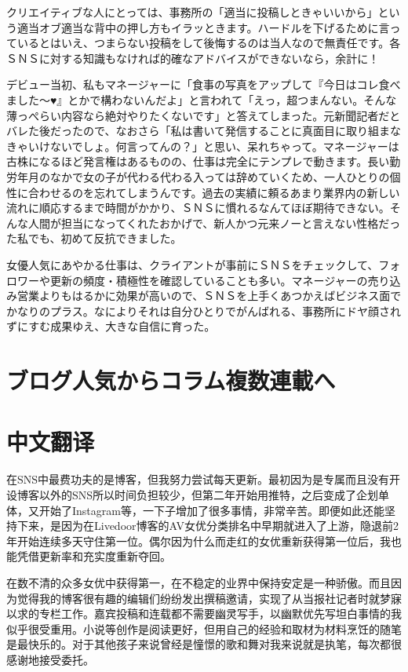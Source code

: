 \documentclass[12pt,UTF8]{ctexbook}
\begin{document}
クリエイティブな人にとっては、事務所の「適当に投稿しときゃいいから」という適当オブ適当な背中の押し方もイラッときます。ハードルを下げるために言っているとはいえ、つまらない投稿をして後悔するのは当人なので無責任です。各ＳＮＳに対する知識もなければ的確なアドバイスができないなら，余計に！

デビュー当初、私もマネージャーに「食事の写真をアップして『今日はコレ食べました〜♥』とかで構わないんだよ」と言われて「えっ，超つまんない。そんな薄っぺらい内容なら絶対やりたくないです」と答えてしまった。元新聞記者だとバレた後だったので、なおさら「私は書いて発信することに真面目に取り組まなきゃいけないでしょ。何言ってんの？」と思い、呆れちゃって。マネージャーは古株になるほど発言権はあるものの、仕事は完全にテンプレで動きます。長い勤労年月のなかで女の子が代わる代わる入っては辞めていくため、一人ひとりの個性に合わせるのを忘れてしまうんです。過去の実績に頼るあまり業界内の新しい流れに順応するまで時間がかかり、ＳＮＳに慣れるなんてほぼ期待できない。そんな人間が担当になってくれたおかげで、新人かつ元来ノーと言えない性格だった私でも、初めて反抗できました。

女優人気にあやかる仕事は、クライアントが事前にＳＮＳをチェックして、フォロワーや更新の頻度・積極性を確認していることも多い。マネージャーの売り込み営業よりもはるかに効果が高いので、ＳＮＳを上手くあつかえばビジネス面でかなりのプラス。なによりそれは自分ひとりでがんばれる、事務所にドヤ顔されずにすむ成果ゆえ、大きな自信に育った。



\section{ブログ人気からコラム複数連載へ}



\section*{中文翻译}

在SNS中最费功夫的是博客，但我努力尝试每天更新。最初因为是专属而且没有开设博客以外的SNS所以时间负担较少，但第二年开始用推特，之后变成了企划单体，又开始了Instagram等，一下子增加了很多事情，非常辛苦。即便如此还能坚持下来，是因为在Livedoor博客的AV女优分类排名中早期就进入了上游，隐退前2年开始连续多天守住第一位。偶尔因为什么而走红的女优重新获得第一位后，我也能凭借更新率和充实度重新夺回。

在数不清的众多女优中获得第一，在不稳定的业界中保持安定是一种骄傲。而且因为觉得我的博客很有趣的编辑们纷纷发出撰稿邀请，实现了从当报社记者时就梦寐以求的专栏工作。嘉宾投稿和连载都不需要幽灵写手，以幽默优先写坦白事情的我似乎很受重用。小说等创作是阅读更好，但用自己的经验和取材为材料烹饪的随笔是最快乐的。对于其他孩子来说曾经是憧憬的歌和舞对我来说就是执笔，每次都很感谢地接受委托。
\end{document}
